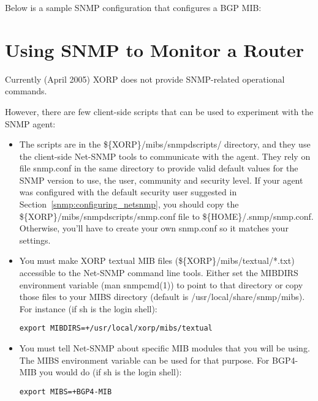 Below is a sample SNMP configuration that configures a BGP MIB:

\vspace{0.1in}
\noindent{}
\vspace{0.1in}

\section{Using SNMP to Monitor a Router}

Currently (April 2005) XORP does not provide SNMP-related operational
commands.

However, there are few client-side scripts that can be used to experiment
with the SNMP agent:

\begin{itemize}
  \item The scripts are in the
  {\stt \$\{XORP\}/mibs/snmpdscripts/} directory, and they use the client-side
  Net-SNMP tools to communicate with the agent.  They rely on file
  {\stt snmp.conf} in the same directory to provide valid default values for
  the SNMP version to use, the user, community and security level. If your
  agent was configured with the default security user suggested in
  Section~\ref{snmp:configuring_netsnmp}, you should copy the
  {\stt \$\{XORP\}/mibs/snmpdscripts/snmp.conf} file to
  {\stt \$\{HOME\}/.snmp/snmp.conf}. Otherwise, you'll have to create your
  own {\stt snmp.conf} so it matches your settings.

  \item You must make XORP textual MIB files
  ({\stt \$\{XORP\}/mibs/textual/*.txt}) accessible to the Net-SNMP command
  line tools.  Either set the {\stt MIBDIRS} environment variable
  ({\stt man snmpcmd(1)}) to point to that directory or copy those files to
  your MIBS directory (default is {\stt /usr/local/share/snmp/mibs}).  For
  instance (if {\stt sh} is the login shell):

  {\tt export MIBDIRS=+/usr/local/xorp/mibs/textual}

  \item You must tell Net-SNMP about specific MIB modules that you will
  be using.  The {\stt MIBS} environment variable can be used for that
  purpose. For BGP4-MIB you would do (if {\stt sh} is the login shell):

  {\tt export MIBS=+BGP4-MIB}

\end{itemize}
